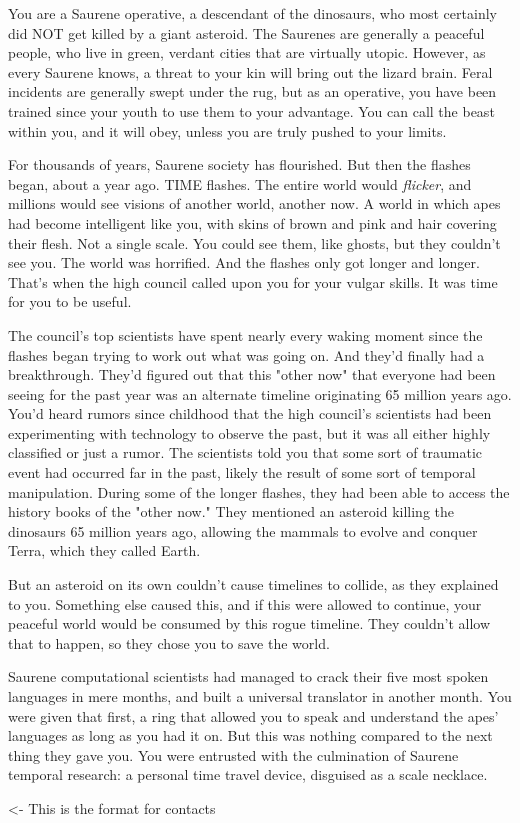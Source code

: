 \documentclass[char]{Extinction-Level-Event}
\begin{document}
\name{\cBandMemberOne{}}

You are a Saurene operative, a descendant of the dinosaurs, who most certainly did NOT get killed by a giant asteroid. The Saurenes are generally a peaceful people, who live in green, verdant cities that are virtually utopic. However, as every Saurene knows, a threat to your kin will bring out the lizard brain. Feral incidents are generally swept under the rug, but as an operative, you have been trained since your youth to use them to your advantage. You can call the beast within you, and it will obey, unless you are truly pushed to your limits.

For thousands of years, Saurene society has flourished. But then the flashes began, about a year ago. TIME flashes. The entire world would \emph{flicker}, and millions would see visions of another world, another now. A world in which apes had become intelligent like you, with skins of brown and pink and hair covering their flesh. Not a single scale. You could see them, like ghosts, but they couldn't see you. The world was horrified. And the flashes only got longer and longer. That's when the high council called upon you for your vulgar skills. It was time for you to be useful.

The council's top scientists have spent nearly every waking moment since the flashes began trying to work out what was going on. And they'd finally had a breakthrough. They'd figured out that this "other now" that everyone had been seeing for the past year was an alternate timeline originating 65 million years ago. You'd heard rumors since childhood that the high council's scientists had been experimenting with technology to observe the past, but it was all either highly classified or just a rumor. The scientists told you that some sort of traumatic event had occurred far in the past, likely the result of some sort of temporal manipulation. During some of the longer flashes, they had been able to access the history books of the "other now." They mentioned an asteroid killing the dinosaurs 65 million years ago, allowing the mammals to evolve and conquer Terra, which they called Earth. 

But an asteroid on its own couldn't cause timelines to collide, as they explained to you. Something else caused this, and if this were allowed to continue, your peaceful world would be consumed by this rogue timeline. They couldn't allow that to happen, so they chose you to save the world.

Saurene computational scientists had managed to crack their five most spoken languages in mere months, and built a universal translator in another month. You were given that first, a ring that allowed you to speak and understand the apes' languages as long as you had it on. But this was nothing compared to the next thing they gave you. You were entrusted with the culmination of Saurene temporal research: a personal time travel device, disguised as a scale necklace.

\begin{itemz}[Goals]
	\item 
\end{itemz}

\begin{itemz}[Notes]
	\item 
\end{itemz}

\begin{contacts}
	\contact{\cTest{}} <- This is the format for contacts 
\end{contacts}
\end{document}
